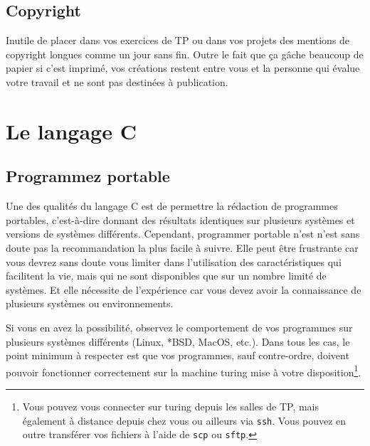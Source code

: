 \documentclass {article}
\begin{document}
\subsection {Copyright}

Inutile de placer dans vos exercices de TP ou dans vos projets des
mentions de copyright longues comme un jour sans fin. Outre le fait
que ça gâche beaucoup de papier si c'est imprimé, vos créations
restent entre vous et la personne qui évalue votre travail et ne sont
pas destinées à publication.


% 
% 


\section {Le langage C}

\subsection {Programmez portable}

Une des qualités du langage C est de permettre la rédaction de
programmes portables, c'est-à-dire donnant des résultats identiques
sur plusieurs systèmes et versions de systèmes différents. Cependant,
programmer portable n'est n'est sans doute pas la recommandation la plus
facile à suivre. Elle peut être frustrante car vous devrez sans doute
vous limiter dans l'utilisation des caractéristiques qui facilitent
la vie, mais qui ne sont disponibles que sur un nombre limité de
systèmes. Et elle nécessite de l'expérience car vous devez avoir la
connaissance de plusieurs systèmes ou environnements.

Si vous en avez la possibilité, observez le comportement de vos
programmes sur plusieurs systèmes différents (Linux, *BSD, MacOS, etc.).
Dans tous les cas, le point minimum à respecter est que vos programmes,
sauf contre-ordre, doivent pouvoir fonctionner correctement sur la machine
turing mise à votre disposition\footnote {Vous pouvez vous connecter
sur turing depuis les salles de TP, mais également à distance depuis
chez vous ou ailleurs via \texttt {ssh}. Vous pouvez en outre transférer
vos fichiers à l'aide de \texttt {scp} ou \texttt {sftp}.}.
\end{document}
